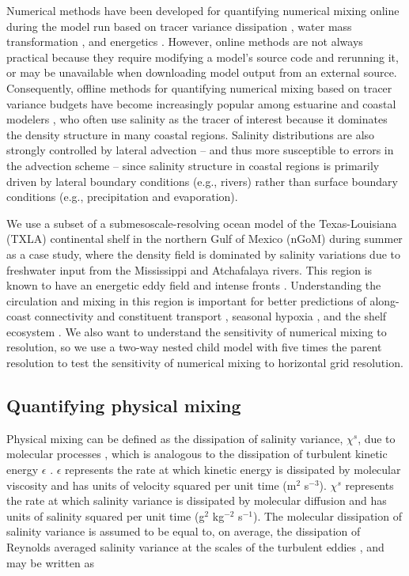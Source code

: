 Numerical methods have been developed for quantifying numerical mixing online during the model run based on tracer variance dissipation \citep{Burchard_2008, Klingbeil_2014}, water mass transformation \citep{Holmes_2021, lee2002spurious, megann2018estimating}, and energetics \citep{Ilicak_2012, petersen2015evaluation, winters1995available}. However, online methods are not always practical because they require modifying a model's source code and rerunning it, or may be unavailable when downloading model output from an external source. Consequently, offline methods for quantifying numerical mixing based on tracer variance budgets have become increasingly popular among estuarine and coastal modelers \citep{Li_2018, MacCready_2018, Wang_2017, Wang_2021}, who often use salinity as the tracer of interest because it dominates the density structure in many coastal regions. Salinity distributions are also strongly controlled by lateral advection -- and thus more susceptible to errors in the advection scheme -- since salinity structure in coastal regions is primarily driven by lateral boundary conditions (e.g., rivers) rather than surface boundary conditions (e.g., precipitation and evaporation). 

We use a subset of a submesoscale-resolving ocean model of the Texas-Louisiana (TXLA) continental shelf in the northern Gulf of Mexico (nGoM) during summer as a case study, where the density field is dominated by salinity variations due to freshwater input from the Mississippi and Atchafalaya rivers. This region is known to have an energetic eddy field \citep{Hetland_2017} and intense fronts \citep{qu2022rapid}. Understanding the circulation and mixing in this region is important for better predictions of along-coast connectivity and constituent transport \citep{thyng2023seasonal}, seasonal hypoxia \citep{Xomchuk_2020, zhang2015processes}, and the shelf ecosystem \citep{fennel2011coupled}. We also want to understand the sensitivity of numerical mixing to resolution, so we use a two-way nested child model with five times the parent resolution to test the sensitivity of numerical mixing to horizontal grid resolution. 

\subsection{Quantifying physical mixing}

Physical mixing can be defined as the dissipation of salinity variance, $\chi^s$, due to molecular processes \citep{Burchard_2009}, which is analogous to the dissipation of turbulent kinetic energy $\epsilon$ \citep{MacCready_2018}. $\epsilon$ represents the rate at which kinetic energy is dissipated by molecular viscosity and has units of velocity squared per unit time (m$^2$ s$^{-3}$). $\chi^s$ represents the rate at which salinity variance is dissipated by molecular diffusion \citep{Nash_2002} and has units of salinity squared per unit time (g$^2$ kg$^{-2}$ s$^{-1}$). The molecular dissipation of salinity variance is assumed to be equal to, on average, the dissipation of Reynolds averaged salinity variance at the scales of the turbulent eddies \citep{Burchard_2008, Nash_2002, osborn1972oceanic}, and may be written as

